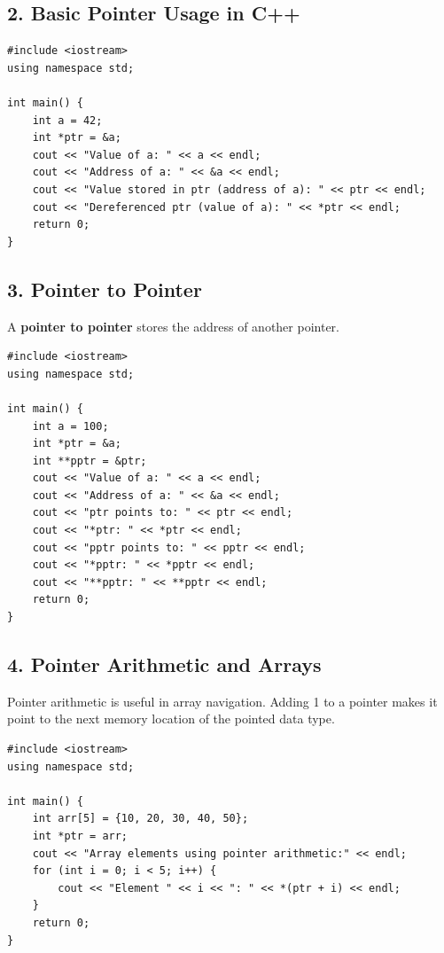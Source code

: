 \subsection*{\large \textbf{2. Basic Pointer Usage in C++}}

\begin{lstlisting}[caption={Basic Pointer Example in C++}]
#include <iostream>
using namespace std;

int main() {
    int a = 42;
    int *ptr = &a;
    cout << "Value of a: " << a << endl;
    cout << "Address of a: " << &a << endl;
    cout << "Value stored in ptr (address of a): " << ptr << endl;
    cout << "Dereferenced ptr (value of a): " << *ptr << endl;
    return 0;
}
\end{lstlisting}

\subsection*{\large \textbf{3. Pointer to Pointer}}

A \textbf{pointer to pointer} stores the address of another pointer.

\begin{lstlisting}[caption={Pointer to Pointer in C++}]
#include <iostream>
using namespace std;

int main() {
    int a = 100;
    int *ptr = &a;
    int **pptr = &ptr;
    cout << "Value of a: " << a << endl;
    cout << "Address of a: " << &a << endl;
    cout << "ptr points to: " << ptr << endl;
    cout << "*ptr: " << *ptr << endl;
    cout << "pptr points to: " << pptr << endl;
    cout << "*pptr: " << *pptr << endl;
    cout << "**pptr: " << **pptr << endl;
    return 0;
}
\end{lstlisting}

\subsection*{\large \textbf{4. Pointer Arithmetic and Arrays}}

Pointer arithmetic is useful in array navigation. Adding 1 to a pointer makes it point to the next memory location of the pointed data type.

\begin{lstlisting}[caption={Pointer Arithmetic with Array in C++}]
#include <iostream>
using namespace std;

int main() {
    int arr[5] = {10, 20, 30, 40, 50};
    int *ptr = arr;
    cout << "Array elements using pointer arithmetic:" << endl;
    for (int i = 0; i < 5; i++) {
        cout << "Element " << i << ": " << *(ptr + i) << endl;
    }
    return 0;
}
\end{lstlisting}

